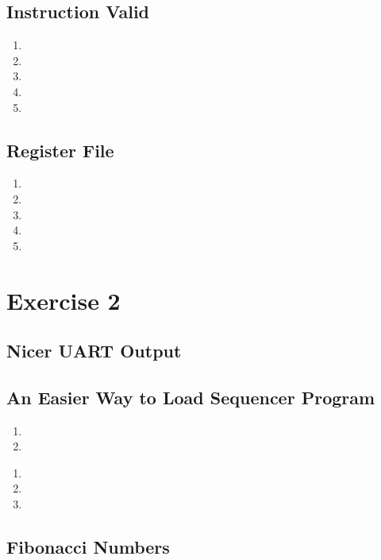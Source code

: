 \documentclass[]{article}
\begin{document}
\subsection{Instruction Valid}
\begin{enumerate}
\item 
\item 
\item 
\item 
\item 
\end{enumerate}
\subsection{Register File}
\begin{enumerate}
\item 
\item 
\item 
\item 
\item 
\end{enumerate}

\section{Exercise 2}


\subsection{Nicer UART Output}
\subsection{An Easier Way to Load Sequencer Program}

\begin{enumerate}
\item 
\item
\end{enumerate}

\begin{enumerate}
\item 
\item
\item
\end{enumerate}

\subsection{Fibonacci Numbers}
\end{document}
